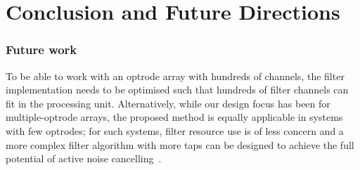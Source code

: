 \chapter{Conclusion and Future Directions}\label{c:conclusion}

\subsection{Future work}

To be able to work with an optrode array with hundreds of channels, the filter implementation needs to be optimised such that hundreds of filter channels can fit in the processing unit.  Alternatively, while our design focus has been for multiple-optrode arrays, the proposed method is equally applicable in systems with few optrodes;  for such systems, filter resource use is of less concern and a more complex filter algorithm with more taps can be designed to achieve the full potential of active noise cancelling~\cite{ANCHeadphone}.
